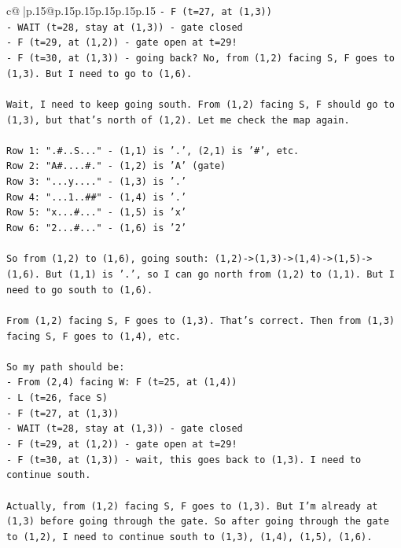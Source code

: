 \documentclass{article}
\begin{document}
{\begin{supertabular}{c@{$\;$}|p{.15\linewidth}@{}p{.15\linewidth}p{.15\linewidth}p{.15\linewidth}p{.15\linewidth}p{.15\linewidth}}
{{{\texttt{{-} F (t=27, at (1,3))} \\
\texttt{{-} WAIT (t=28, stay at (1,3)) {-} gate closed} \\
\texttt{{-} F (t=29, at (1,2)) {-} gate open at t=29!} \\
\texttt{{-} F (t=30, at (1,3)) {-} going back? No, from (1,2) facing S, F goes to (1,3). But I need to go to (1,6).} \\
\\ 
\texttt{Wait, I need to keep going south. From (1,2) facing S, F should go to (1,3), but that's north of (1,2). Let me check the map again.} \\
\\ 
\texttt{Row 1: ".\#..S..." {-} (1,1) is '.', (2,1) is '\#', etc.} \\
\texttt{Row 2: "A\#....\#." {-} (1,2) is 'A' (gate)} \\
\texttt{Row 3: "...y...." {-} (1,3) is '.'} \\
\texttt{Row 4: "...1..\#\#" {-} (1,4) is '.'} \\
\texttt{Row 5: "x...\#..." {-} (1,5) is 'x'} \\
\texttt{Row 6: "2...\#..." {-} (1,6) is '2'} \\
\\ 
\texttt{So from (1,2) to (1,6), going south: (1,2){-}>(1,3){-}>(1,4){-}>(1,5){-}>(1,6). But (1,1) is '.', so I can go north from (1,2) to (1,1). But I need to go south to (1,6).} \\
\\ 
\texttt{From (1,2) facing S, F goes to (1,3). That's correct. Then from (1,3) facing S, F goes to (1,4), etc.} \\
\\ 
\texttt{So my path should be:} \\
\texttt{{-} From (2,4) facing W: F (t=25, at (1,4))} \\
\texttt{{-} L (t=26, face S)} \\
\texttt{{-} F (t=27, at (1,3))} \\
\texttt{{-} WAIT (t=28, stay at (1,3)) {-} gate closed} \\
\texttt{{-} F (t=29, at (1,2)) {-} gate open at t=29!} \\
\texttt{{-} F (t=30, at (1,3)) {-} wait, this goes back to (1,3). I need to continue south.} \\
\\ 
\texttt{Actually, from (1,2) facing S, F goes to (1,3). But I'm already at (1,3) before going through the gate. So after going through the gate to (1,2), I need to continue south to (1,3), (1,4), (1,5), (1,6).} \\
}}}
\end{supertabular}}
\end{document}
